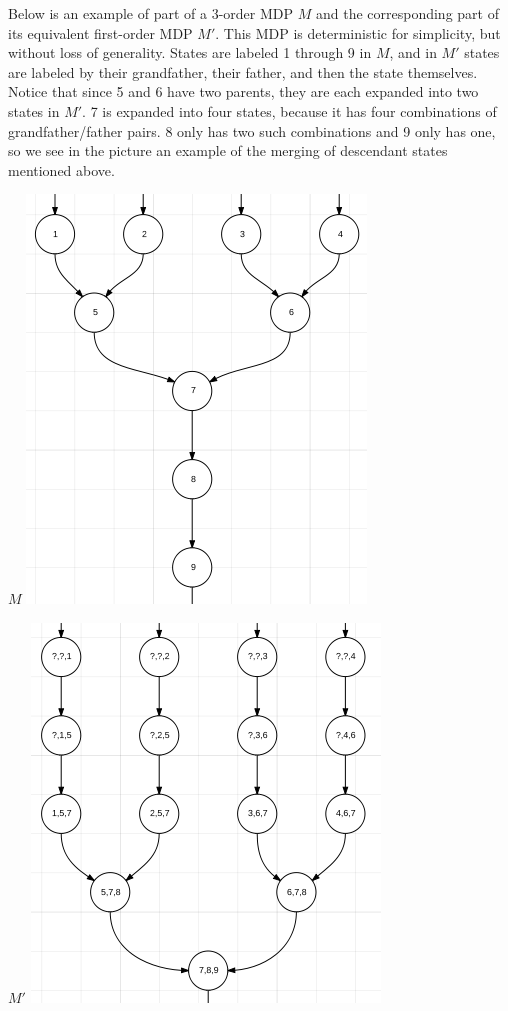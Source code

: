 \documentclass{article}
\begin{document}
Below is an example of part of a 3-order MDP $M$ and the corresponding part of
its equivalent first-order MDP $M'$. This MDP is deterministic for simplicity,
but without loss of generality.
States are labeled 1 through 9 in $M$, and
in $M'$ states are labeled by their grandfather, their father, and then the
state themselves. Notice that since 5 and 6 have two parents, they are each
expanded into two states in $M'$. 7 is expanded into four states, because it
has four combinations of grandfather/father pairs. 8 only has two such
combinations and 9 only has one, so we see in the picture an example of the
merging of descendant states mentioned above. 

\newpage

\begin{center}

$M$
\includegraphics[scale=0.85]{M.png}

\vspace{5em}

$M'$
\includegraphics[scale=0.85]{M_prime.png}

\end{center}
\end{document}
